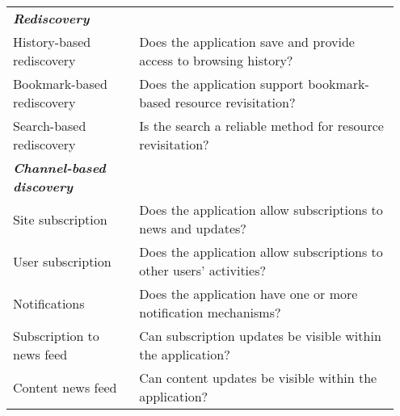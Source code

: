 \begin{table*}[ht!]
\begin{tabular}{|p{0.31\linewidth}|p{0.64\linewidth}|}
\emph{\textbf{Rediscovery}}                     &                                                                                                           \\
History-based rediscovery    & Does the application save and provide access to browsing history?                                        \\
Bookmark-based rediscovery   & Does the application support bookmark-based resource revisitation?                                        \\
Search-based rediscovery     & Is the search a reliable method for resource revisitation?                             \\

\emph{\textbf{Channel-based discovery}}          &                                                                                                           \\
Site subscription            & Does the application allow subscriptions to news and updates?                                             \\
User subscription             & Does the application allow subscriptions to other users' activities?                                      \\
Notifications                & Does the application have one or more notification mechanisms?                                                      \\
Subscription to news feed                  & Can subscription updates be visible within the application?  \\
Content news feed                  & Can content updates be visible within the application? \\

\hline     

         
\end{tabular}
\end{table*}


